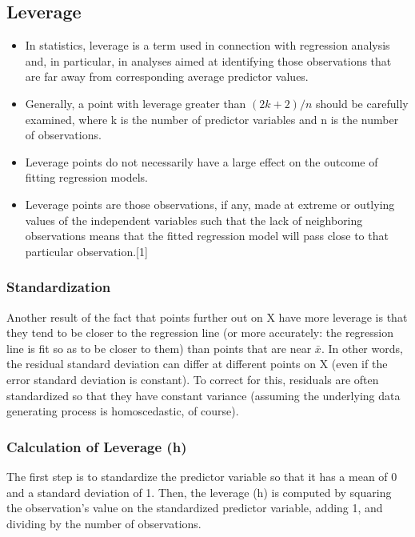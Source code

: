 \documentclass[residuals.tex]{subfiles}
\begin{document}
\subsection{Leverage}
\begin{itemize}
\item In statistics, leverage is a term used in connection with regression analysis and, in particular, in analyses aimed at identifying those observations that are far away from corresponding average predictor values.

\item Generally, a point with leverage greater than $(2k+2)/n$ should be carefully examined, where k is the number of predictor variables and n is the number of observations.
\item  Leverage points do not necessarily have a large effect on the outcome of fitting regression models.

\item Leverage points are those observations, if any, made at extreme or outlying values of the independent variables such that the lack of neighboring observations means that the fitted regression model will pass close to that particular observation.[1]


\end{itemize}

\subsubsection{Standardization}
Another result of the fact that points further out on X have more leverage is that they tend to be closer to the regression line (or more accurately: the regression line is fit so as to be closer to them) than points that are near $\bar{x}$. In other words, the residual standard deviation can differ at different points on X (even if the error standard deviation is constant). To correct for this, residuals are often standardized so that they have constant variance (assuming the underlying data generating process is homoscedastic, of course).


\subsubsection{Calculation of Leverage (h)}
The first step is to standardize the predictor variable so that it has a mean of 0 and a standard deviation of 1. Then, the leverage (h) is computed by squaring the observation's value on the standardized predictor variable, adding 1, and dividing by the number of observations.

\end{document}
